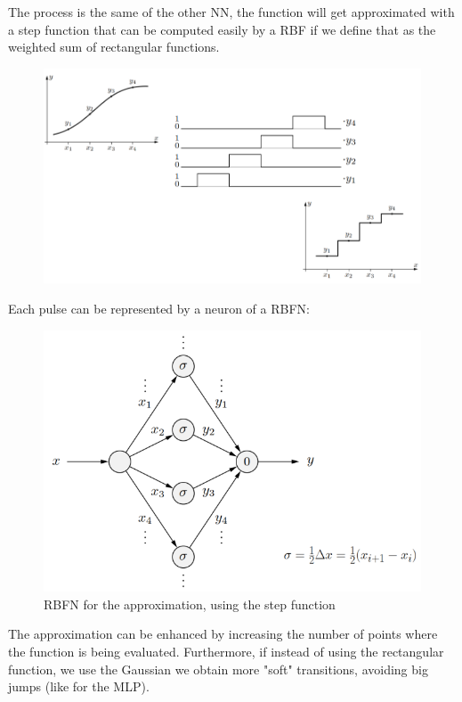 \documentclass{article}
\begin{document}
The process is the same of the other NN, the function will get approximated with a step function that
can be computed easily by a RBF if we define that as the weighted sum of rectangular functions.
\begin{figure}[H]
    \centering
    \includegraphics[scale=0.4]{images/scale_func.png}
\end{figure}
Each pulse can be represented by a neuron of a RBFN:
\begin{figure}
    \centering
    \includegraphics[scale=0.5]{images/nn_funcapprox_rbfn.png}
    \caption{RBFN for the approximation, using the step function}
\end{figure}
The approximation can be enhanced by increasing the number of points where the function is
being evaluated. Furthermore, if instead of using the rectangular function, we
use the Gaussian we obtain more "soft" transitions, avoiding big jumps (like for the MLP).
\end{document}
